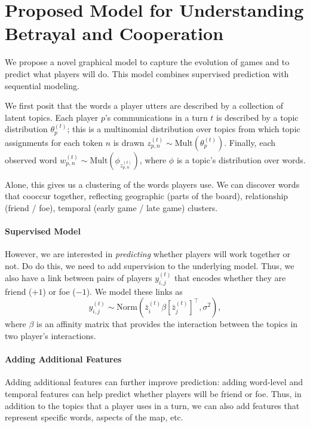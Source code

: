 \documentclass[11pt,letterpaper]{article}
\newcommand{\mult}[1]{\mbox{Mult}( #1)}
\newcommand{\norm}[2]{\mbox{Norm}\left(#1, #2\right)}
\begin{document}
\section{Proposed Model for Understanding Betrayal and Cooperation}
\label{sec:model}

We propose a novel graphical model to capture the evolution of games
and to predict what players will do.  This model combines supervised
prediction with sequential modeling.

We first posit that the words a player utters are described by a
collection of latent topics.  Each player $p$'s communications in a
turn $t$ is described by a topic distribution $\theta^{(t)}_{p}$; this
is a multinomial distribution over topics from which topic assignments
for each token $n$ is drawn $z^{(t)}_{p,n} \sim
\mult{\theta^{(t)}_{p}}$.  Finally, each observed word $w^{(t)}_{p,n}
\sim \mult{\phi_{z^{(t)}_{p,n}}}$, where $\phi$ is a topic's
distribution over words.

Alone, this gives us a clustering of the words players use.  We can
discover words that cooccur together, reflecting geographic (parts of
the board), relationship (friend / foe), temporal (early game / late
game) clusters.

\paragraph{Supervised Model}

However, we are interested in \emph{predicting} whether players will
work together or not.  Do do this, we need to add supervision to the
underlying model.  Thus, we also have a link between pairs of players
$y^(t)_{i,j}$ that encodes whether they are friend ($+1$) or foe ($-1$).
We model these links as
\begin{equation}
y^{(t)}_{i,j} \sim \norm{\bar{z}^{(t)}_{i} \beta \left[ \bar{z}^{(t)}_{j}\right]^{\top}}{\sigma^2},
\end{equation}
where $\beta$ is an affinity matrix that provides the interaction
between the topics in two player's interactions.

\paragraph{Adding Additional Features}

Adding additional features can further improve prediction: adding
word-level and temporal features can help predict whether players will
be friend or foe.  Thus, in addition to the topics that a player uses
in a turn, we can also add features that represent specific words,
aspects of the map, etc.
\end{document}
